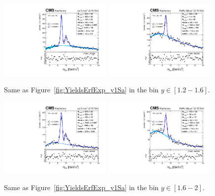 \begin{figure}
  \includegraphics[width=0.49\textwidth]{Chapters/aYield/pp/pt_3p5_4/Rap/Rap_1p2_1p6/pp2p76tev_Rap_1p2_1p6_fsr1.pdf}
  \includegraphics[width=0.49\textwidth]{Chapters/aYield/PbPb/pt_3p5_4/Rap/Rap_1p2_1p6/PbPb_Rap_1p2_1p6_fsr1.pdf}  
 \caption{Same as Figure~\ref{fig:YieldsErfExp_y1Sa} in the bin $y\in [1.2 - 1.6]$.}
  \label{fig:YieldsErfExp_y1Sd} 
\end{figure}
\begin{figure}
  \includegraphics[width=0.49\textwidth]{Chapters/aYield/pp/pt_3p5_4/Rap/Rap_1p6_2/pp2p76tev_Rap_1p6_2_fsr1.pdf}
  \includegraphics[width=0.49\textwidth]{Chapters/aYield/PbPb/pt_3p5_4/Rap/Rap_1p6_2/PbPb_Rap_1p6_2_fsr1.pdf}
  \caption{Same as Figure~\ref{fig:YieldsErfExp_y1Sa} in the bin $y\in [1.6 - 2]$.}
  \label{fig:YieldsErfExp_y1Se} 
\end{figure}
